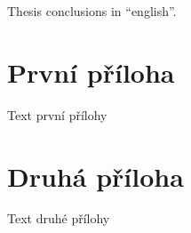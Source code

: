 \documentclass[a4paper,12pt]{article}
\begin{document}
\begin{upconclusions}[english]
Thesis conclusions in \enquote{english}.
\end{upconclusions}

\upprintabbrevlist

\upprintbibliography

\upappendix
\section{První příloha}
Text první přílohy

\section{Druhá příloha}
Text druhé přílohy

\upprintindex
\end{document}
